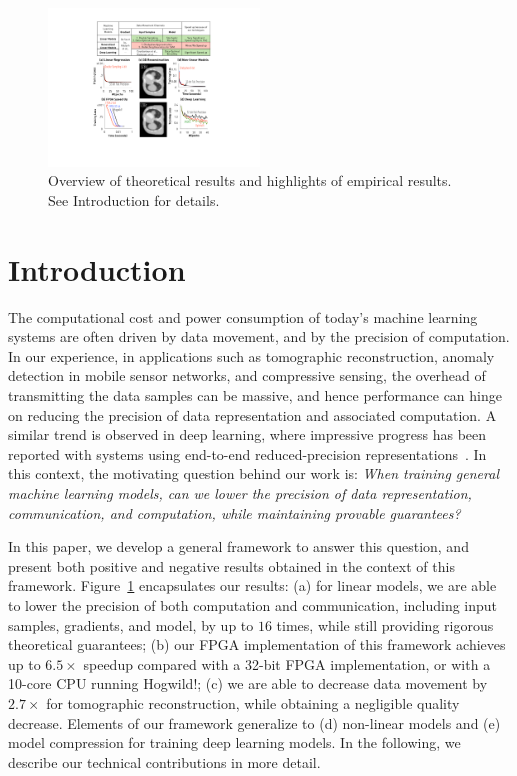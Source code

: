 \documentclass{article}
\begin{document}
\begin{figure}[t]
\centering
\includegraphics[width=0.5\textwidth]{Figures/RSHighlight}    
\caption{Overview of theoretical results and
highlights of empirical results. See
Introduction for details.}
\label{fig:highlight}
\end{figure}

\section{Introduction}

The computational cost and power consumption of today's machine learning systems are often driven by data movement, and by the precision of computation. 
In our experience, in applications such as tomographic reconstruction, anomaly detection in mobile sensor networks,
and compressive sensing, the overhead of transmitting the data samples can be massive, 
and hence performance can hinge on reducing the precision of data representation and 
associated computation. 
A similar trend is observed in deep learning, where impressive progress has been reported with systems 
using end-to-end reduced-precision representations~\cite{hubara2016quantized,
rastegari2016xnor,zhou2016dorefa,miyashita2016convolutional}. 
In this context, the motivating question behind our work is:  {\em When training general machine learning models,
can we lower the precision of data representation,
communication, and computation, while maintaining provable guarantees?}
 
In this paper, we develop a general 
framework to answer this question, and
present both positive and negative results
 obtained in the context of this framework. 
 Figure~\ref{fig:highlight} encapsulates our results: 
(a) for linear models, we are able to lower the precision of both computation and communication, including input samples, gradients, and model, by up to $16$ times, while still providing rigorous theoretical guarantees; 
(b) our FPGA implementation of this framework achieves up to $6.5\times$ speedup compared with
a 32-bit FPGA implementation, or with a 10-core CPU running Hogwild!;  
(c) we are able to decrease data movement by $2.7\times$ for
tomographic reconstruction, while obtaining a negligible quality decrease. 
Elements of our framework generalize to (d) non-linear models and (e) model compression for training deep learning models. 
In the following, we describe our technical contributions in more detail. 
\end{document}
